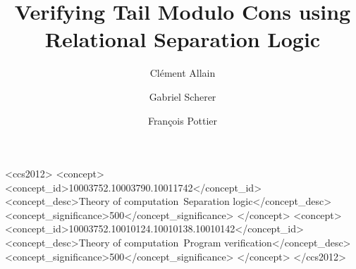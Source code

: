 \documentclass[acmsmall,screen,review,anonymous]{acmart}
\begin{document}
\title{Verifying Tail Modulo Cons using Relational Separation Logic}

\author{Clément Allain}

\author{Gabriel Scherer}

\author{François Pottier}

\begin{abstract}
  
\end{abstract}

\maketitle


\begin{CCSXML}
<ccs2012>
<concept>
<concept_id>10003752.10003790.10011742</concept_id>
<concept_desc>Theory of computation~Separation logic</concept_desc>
<concept_significance>500</concept_significance>
</concept>
<concept>
<concept_id>10003752.10010124.10010138.10010142</concept_id>
<concept_desc>Theory of computation~Program verification</concept_desc>
<concept_significance>500</concept_significance>
</concept>
</ccs2012>
\end{CCSXML}




\clearpage


\clearpage


\clearpage


\clearpage


\clearpage


\clearpage


\clearpage


\clearpage


\clearpage

\end{document}
